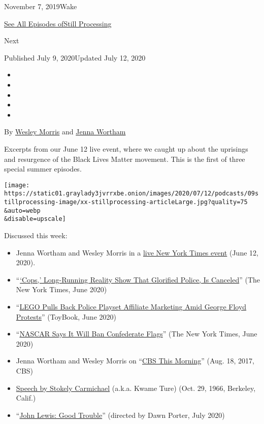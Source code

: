 November 7, 2019Wake

\href{https://www.nytimes3xbfgragh.onion/column/still-processing-podcast}{See
All Episodes ofStill Processing}

Next

Published July 9, 2020Updated July 12, 2020

\begin{itemize}
\item
\item
\item
\item
\item
\end{itemize}

By \href{https://www.nytimes3xbfgragh.onion/by/wesley-morris}{Wesley
Morris} and
\href{https://www.nytimes3xbfgragh.onion/by/jenna-wortham}{Jenna
Wortham}

Excerpts from our June 12 live event, where we caught up about the
uprisings and resurgence of the Black Lives Matter movement. This is the
first of three special summer episodes.

\texttt{[image: https://static01.graylady3jvrrxbe.onion/images/2020/07/12/podcasts/09stillprocessing-image/xx-stillprocessing-articleLarge.jpg?quality=75\\\&auto=webp\\\&disable=upscale]}

Discussed this week:

\begin{itemize}
\item
  Jenna Wortham and Wesley Morris in a
  \href{https://timesevents.nytimes3xbfgragh.onion/stillprocessing0612}{live
  New York Times event} (June 12, 2020).
\item
  ``\href{https://www.nytimes3xbfgragh.onion/2020/06/09/business/media/cops-canceled-paramount-tv-show.html}{`Cops,'
  Long-Running Reality Show That Glorified Police, Is Canceled}'' (The
  New York Times, June 2020)
\item
  ``\href{https://toybook.com/lego-pulling-back-potentially-sensitive-product-amid-george-floyd-protests/}{LEGO
  Pulls Back Police Playset Affiliate Marketing Amid George Floyd
  Protests}'' (ToyBook, June 2020)
\item
  ``\href{https://www.nytimes3xbfgragh.onion/2020/06/10/sports/autoracing/nascar-confederate-flags.html}{NASCAR
  Says It Will Ban Confederate Flags}'' (The New York Times, June 2020)
\item
  Jenna Wortham and Wesley Morris on
  ``\href{https://www.youtube.com/watch?v=my1FfSsT5-E}{CBS This
  Morning}'' (Aug. 18, 2017, CBS)
\item
  \href{http://americanradioworks.publicradio.org/features/blackspeech/scarmichael.html}{Speech
  by Stokely Carmichael} (a.k.a. Kwame Ture) (Oct. 29, 1966, Berkeley,
  Calif.)
\item
  ``\href{https://www.youtube.com/watch?v=z_oEkOdIXdo}{John Lewis: Good
  Trouble}'' (directed by Dawn Porter, July 2020)
\end{itemize}


